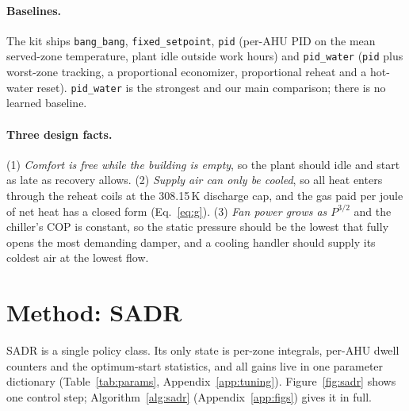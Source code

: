 \paragraph{Baselines.} The kit ships \texttt{bang\_bang}, \texttt{fixed\_setpoint}, \texttt{pid} (per-AHU PID on the mean served-zone temperature, plant idle outside work hours) and \texttt{pid\_water} (\texttt{pid} plus worst-zone tracking, a proportional economizer, proportional reheat and a hot-water reset). \texttt{pid\_water} is the strongest and our main comparison; there is no learned baseline.

\paragraph{Three design facts.} (1) \emph{Comfort is free while the building is empty}, so the plant should idle and start as late as recovery allows. (2) \emph{Supply air can only be cooled}, so all heat enters through the reheat coils at the 308.15\,K discharge cap, and the gas paid per joule of net heat has a closed form (Eq.~\ref{eq:g}). (3) \emph{Fan power grows as $P^{3/2}$} and the chiller's COP is constant, so the static pressure should be the lowest that fully opens the most demanding damper, and a cooling handler should supply its coldest air at the lowest flow.

\section{Method: SADR}
\label{sec:method}

SADR is a single policy class. Its only state is per-zone integrals, per-AHU dwell counters and the optimum-start statistics, and all gains live in one parameter dictionary (Table~\ref{tab:params}, Appendix~\ref{app:tuning}). Figure~\ref{fig:sadr} shows one control step; Algorithm~\ref{alg:sadr} (Appendix~\ref{app:figs}) gives it in full.

